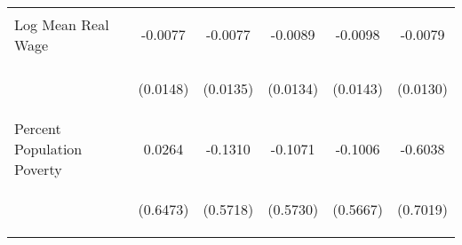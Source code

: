 \begin{center}
\begin{tabular}{lccccc}
\noalign{\smallskip}Log Mean Real Wage & \begin{scriptsize}-0.0077\end{scriptsize} & \begin{scriptsize}-0.0077\end{scriptsize} & \begin{scriptsize}-0.0089\end{scriptsize} & \begin{scriptsize}-0.0098\end{scriptsize} & \begin{scriptsize}-0.0079\end{scriptsize}\\
 & \begin{scriptsize}(0.0148)\end{scriptsize} & \begin{scriptsize}(0.0135)\end{scriptsize} & \begin{scriptsize}(0.0134)\end{scriptsize} & \begin{scriptsize}(0.0143)\end{scriptsize} & \begin{scriptsize}(0.0130)\end{scriptsize}\\
\noalign{\smallskip}Percent Population Poverty & \begin{scriptsize}0.0264\end{scriptsize} & \begin{scriptsize}-0.1310\end{scriptsize} & \begin{scriptsize}-0.1071\end{scriptsize} & \begin{scriptsize}-0.1006\end{scriptsize} & \begin{scriptsize}-0.6038\end{scriptsize}\\
 & \begin{scriptsize}(0.6473)\end{scriptsize} & \begin{scriptsize}(0.5718)\end{scriptsize} & \begin{scriptsize}(0.5730)\end{scriptsize} & \begin{scriptsize}(0.5667)\end{scriptsize} & \begin{scriptsize}(0.7019)\end{scriptsize}\\

\end{tabular}
\end{center}
